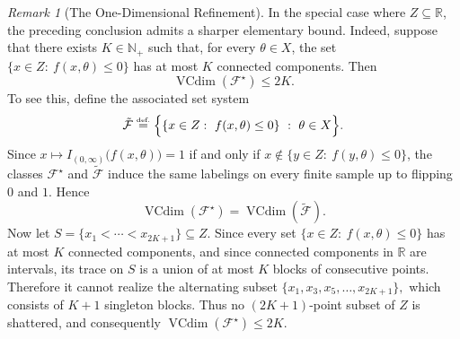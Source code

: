 \documentclass{article}
\newcommand{\eqdef}{\ensuremath{\stackrel{\mbox{\upshape\tiny def.}}{=}}}
\theoremstyle{plain}
\theoremstyle{definition}
\theoremstyle{remark}
\newtheorem{remark}[theorem]{Remark}
\theoremstyle{plain}
\numberwithin{thm}{section}
\theoremstyle{definition}
\numberwithin{equation}{section}
\begin{document}
\begin{remark}[The One-Dimensional Refinement]
\label{rem:VC_Dim_Bounds_One_Dimensional}
In the special case where $Z\subseteq \mathbb{R}$, the preceding conclusion admits a sharper elementary bound.
Indeed, suppose that there exists $K\in\mathbb{N}_+$ such that, for every $\theta\in X$, the set
$
    \{x\in Z:\ f(x,\theta)\le 0\}
$
has at most $K$ connected components.  Then
\[
    \operatorname{VCdim}(\mathcal{F}^{\star})\le 2K.
\]
To see this, define the associated set system
\[
\tilde{\mathcal{F}}
\eqdef
\Big\{
\{x\in Z:\ f(x,\theta)\le 0\}
\ :\ \theta\in X
\Big\}.
\]
Since $x\mapsto I_{(0,\infty)}\big(f(x,\theta)\big)=1$ if and only if
$x\notin \{y\in Z:\ f(y,\theta)\le 0\}$, the classes $\mathcal{F}^{\star}$ and $\tilde{\mathcal{F}}$ induce the same
labelings on every finite sample up to flipping $0$ and $1$.  Hence
\[
    \operatorname{VCdim}(\mathcal{F}^{\star})
    =
    \operatorname{VCdim}(\tilde{\mathcal{F}}).
\]
Now let $S=\{x_1<\cdots<x_{2K+1}\}\subseteq Z$.  Since every set
$\{x\in Z:\ f(x,\theta)\le 0\}$ has at most $K$ connected components, and since connected components in
$\mathbb{R}$ are intervals, its trace on $S$ is a union of at most $K$ blocks of consecutive points.  Therefore it
cannot realize the alternating subset
$
    \{x_1,x_3,x_5,\dots,x_{2K+1}\},
$
which consists of $K+1$ singleton blocks.  Thus no $(2K+1)$-point subset of $Z$ is shattered, and consequently
$
    \operatorname{VCdim}(\mathcal{F}^{\star})\le 2K
$.
\end{remark}
\end{document}

